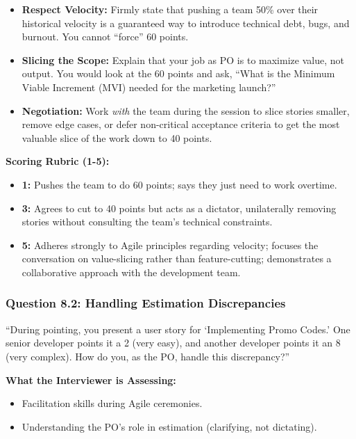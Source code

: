 \documentclass[
  11pt,
  openany,
  oneside]{book}
\providecommand{\tightlist}{%
  \setlength{\itemsep}{0pt}\setlength{\parskip}{0pt}}
\begin{document}
\begin{itemize}
\tightlist
\item
  \textbf{Respect Velocity:} Firmly state that pushing a team 50\% over
  their historical velocity is a guaranteed way to introduce technical
  debt, bugs, and burnout. You cannot ``force'' 60 points.
\item
  \textbf{Slicing the Scope:} Explain that your job as PO is to maximize
  value, not output. You would look at the 60 points and ask, ``What is
  the Minimum Viable Increment (MVI) needed for the marketing launch?''
\item
  \textbf{Negotiation:} Work \emph{with} the team during the session to
  slice stories smaller, remove edge cases, or defer non-critical
  acceptance criteria to get the most valuable slice of the work down to
  40 points.
\end{itemize}

\textbf{Scoring Rubric (1-5):}

\begin{itemize}
\tightlist
\item
  \textbf{1:} Pushes the team to do 60 points; says they just need to
  work overtime.
\item
  \textbf{3:} Agrees to cut to 40 points but acts as a dictator,
  unilaterally removing stories without consulting the team's technical
  constraints.
\item
  \textbf{5:} Adheres strongly to Agile principles regarding velocity;
  focuses the conversation on value-slicing rather than feature-cutting;
  demonstrates a collaborative approach with the development team.
\end{itemize}

\subsubsection{Question 8.2: Handling Estimation
Discrepancies}\label{question-8.2-handling-estimation-discrepancies}

``During pointing, you present a user story for `Implementing Promo
Codes.' One senior developer points it a 2 (very easy), and another
developer points it an 8 (very complex). How do you, as the PO, handle
this discrepancy?''

\textbf{What the Interviewer is Assessing:}

\begin{itemize}
\tightlist
\item
  Facilitation skills during Agile ceremonies.
\item
  Understanding the PO's role in estimation (clarifying, not dictating).
\end{itemize}
\end{document}
